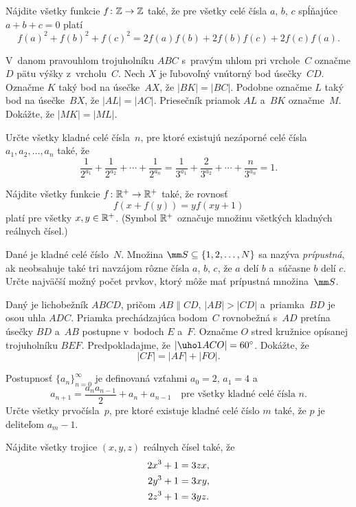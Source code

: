 {%
Nájdite všetky funkcie $f\colon\Bbb Z\to\Bbb Z$ také, že pre
všetky celé čísla $a$, $b$, $c$ spĺňajúce $a+b+c=0$ platí
$$
f(a)^2 + f(b)^2 + f(c)^2  =  2f(a)f(b) + 2f(b)f(c) + 2f(c)f(a).
$$
}

{%
V~danom pravouhlom trojuholníku $ABC$ s~pravým uhlom pri vrchole~$C$ označme $D$ pätu výšky z~vrcholu~$C$. Nech $X$ je ľubovoľný vnútorný bod úsečky~$CD$. Označme $K$ taký bod na úsečke~$AX$, že $|BK|=|BC|$. Podobne označme $L$ taký bod na úsečke~$BX$, že $|AL|=|AC|$.
Priesečník priamok $AL$ a~$BK$ označme~$M$. Dokážte, že $|MK|=|ML|$.}

{%
Určte všetky kladné celé čísla~$n$, pre ktoré existujú nezáporné celé čísla $a_1,a_2,\dots,a_n$ také, že
$$
\frac{1}{2^{a_1}}+\frac{1}{2^{a_2}}+\cdots+\frac{1}{2^{a_n}}  =
\frac{1}{3^{a_1}}+\frac{2}{3^{a_2}}+\cdots+\frac{n}{3^{a_n}}  = 1.
$$
}

{%
Nájdite všetky funkcie $f\colon\Bbb R^+\to \Bbb R^+$ také, že rovnosť
$$
f(x+f(y))=yf(xy+1)
$$
platí pre všetky $x,y\in\Bbb R^+$. (Symbol $\Bbb R^+$ označuje množinu všetkých kladných reálnych čísel.)}

{%
Dané je kladné celé číslo~$N$. Množina $\mm S \subseteq \{1,2,\dots,N \}$ sa nazýva {\it prípustná}, ak neobsahuje také tri navzájom rôzne čísla $a$, $b$, $c$, že $a$ delí $b$ a~súčasne $b$ delí $c$. Určte najväčší možný počet prvkov, ktorý môže mať prípustná množina~$\mm S$.}

{%
Daný je lichobežník $ABCD$, pričom $AB\parallel CD$, $|AB|>|CD|$ a~priamka~$BD$ je osou uhla $ADC$.
Priamka prechádzajúca bodom~$C$ rovnobežná s~$AD$ pretína úsečky $BD$ a~$AB$ postupne v~bodoch $E$ a~$F$. Označme $O$ stred kružnice opísanej trojuholníku $BEF$. Predpokladajme, že $|\uhol ACO| = 60^\circ$. Dokážte, že
$$
|CF| = |AF| + |FO|.
$$}

{%
Postupnosť $\{a_n\}_{n=0}^\infty$ je definovaná vzťahmi $a_0=2$, $a_1=4$ a
$$
a_{n+1}=\frac{a_na_{n-1}}{2}+a_n+a_{n-1}\quad \text{pre všetky kladné celé čísla $n$.}
$$
Určte všetky prvočísla~$p$, pre ktoré existuje kladné celé číslo $m$ také, že $p$ je deliteľom $a_m-1$.}

{%
Nájdite všetky trojice $(x,y,z)$ reálnych čísel také, že
$$
\aligned
2x^3+1 &= 3zx,\\
2y^3+1 &= 3xy,\\
2z^3+1 &= 3yz.
\endaligned
$$
}

